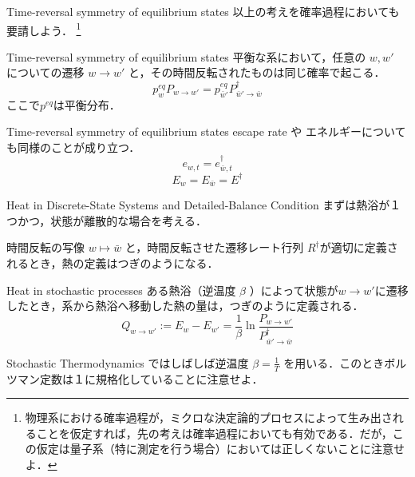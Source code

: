 \documentclass[aspectratio=169, dvipdfmx, 11pt,uplatex]{beamer} %
\begin{document}
\begin{frame}{Time-reversal symmetry of equilibrium states}
  以上の考えを確率過程においても要請しよう．
  \footnote{物理系における確率過程が，ミクロな決定論的プロセスによって生み出されることを仮定すれば，先の考えは確率過程においても有効である．だが，この仮定は量子系（特に測定を行う場合）においては正しくないことに注意せよ．}
  \begin{block}{Time-reversal symmetry of equilibrium states}
    平衡な系において，任意の $w, w'$ についての遷移 $w \to w'$ と，その時間反転されたものは同じ確率で起こる．
    \begin{equation}
      p_w^{eq} P_{w \to w'} = p_{\bar{w}'}^{eq} P_{\bar{w}' \to \bar{w}}^{\dagger}
    \end{equation}
    ここで$p^{eq}$は平衡分布．
  \end{block}
\end{frame}

\begin{frame}{Time-reversal symmetry of equilibrium states}
  escape rate や エネルギーについても同様のことが成り立つ．
  \begin{equation}
    e_{w, t} = e_{\bar{w}, t}^{\dagger}
  \end{equation}
  \begin{equation}
    E_w = E_{\bar{w}} = E^{\dagger}
  \end{equation}
\end{frame}

\begin{frame}{Heat in Discrete-State Systems and Detailed-Balance Condition}
  まずは熱浴が１つかつ，状態が離散的な場合を考える．\par 
  時間反転の写像 $w \mapsto \bar{w}$ と，時間反転させた遷移レート行列 $R^{\dagger }$が適切に定義されるとき，熱の定義はつぎのようになる．
  \begin{block}{Heat in stochastic processes}
    ある熱浴（逆温度 $\beta $ ）によって状態が$w \to w'$に遷移したとき，系から熱浴へ移動した熱の量は，つぎのように定義される．
    \begin{equation}
      Q_{w \to w'} := E_w - E_{w'} = \frac{1}{\beta } \ln \frac{P_{w \to w'}}{P_{\bar{w}' \to \bar{w}}^{\dagger }}
    \end{equation}
  \end{block}
  Stochastic Thermodynamics ではしばしば逆温度 $\beta = \frac{1}{T}$ を用いる．このときボルツマン定数は１に規格化していることに注意せよ．
\end{frame}
\end{document}
